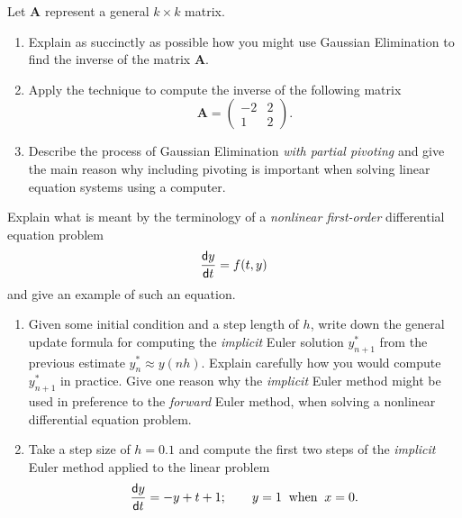 \documentclass[12pt]{article}
\def\bA{\mathbf{A}}
\newcommand{\dif}{\mathsf{d}}
\begin{document}
\question
Let $\bA$ represent a general $k\times k$ matrix.
\begin{enumerate}
\item
Explain as succinctly as possible how you might use  Gaussian Elimination to find the inverse of
the matrix $\bA$.  

\item
Apply  the  technique to compute   the inverse of  the following matrix
$$ \bA = \left( \begin{array}{cc} -2 &2  \\ 1 & 2 \end{array} \right). $$
\null\vspace{-0.6cm}

 \item
Describe the process of    Gaussian Elimination  {\it with partial pivoting} and give the main reason
why including pivoting is  important when solving linear equation systems using
a computer.
\null\vspace{-0.4cm} 
\end{enumerate}
\bigskip
\question
Explain what is meant by  the terminology of a {\it nonlinear  first-order} differential equation
problem
$$
{\dif y\over \dif t} = f(t,y)
$$
and give an example of such an equation.
\null\vspace{-0.4cm} 

\begin{enumerate}
\item
Given some initial condition and a  step length of $h$,
write down the general update formula for computing the {\it implicit} Euler
solution  $y^*_{n+1}$  from the previous estimate $y^*_n \approx y(nh)$.
Explain carefully how you would  compute  $y^*_{n+1}$ in practice.
Give one reason why  the  {\it implicit} Euler method might be used
in preference to the  {\it forward} Euler method, when solving a nonlinear
differential equation problem.
\null\vspace{-0.2cm} 

\item
 Take a  step size  of $h=0.1$  and
compute the first two steps of the  {\it implicit} Euler  method
applied to the linear problem
$$ \frac{\dif y}{\dif t} =  -y + t +1   ; \qquad y=1\>\hbox{ when }\> x=0. $$
\end{enumerate}


\finished
\end{document}

